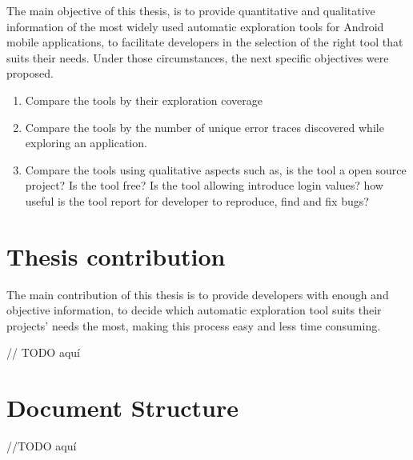 The main objective of this thesis, is to provide quantitative and qualitative information of the most widely used automatic exploration tools for Android mobile applications, to facilitate developers in the selection of the right tool that suits their needs. Under those circumstances, the next specific objectives were proposed.
		\begin{enumerate}
			\item Compare the tools by their exploration coverage 
			\item Compare the tools by the number of unique error traces discovered while exploring an application.
			\item Compare the tools using qualitative aspects such as, is the tool a open source project? Is the tool free? Is the tool allowing introduce login values? how useful is the tool report for developer to reproduce, find and fix bugs?
		\end{enumerate}

\section{Thesis contribution} \label{sec:thesisContribution}

The main contribution of this thesis is to provide developers with enough and objective information, to decide which automatic exploration tool suits their projects' needs the most, making this process easy and less time consuming.

// TODO aquí

	
\section{Document Structure}
//TODO aquí

